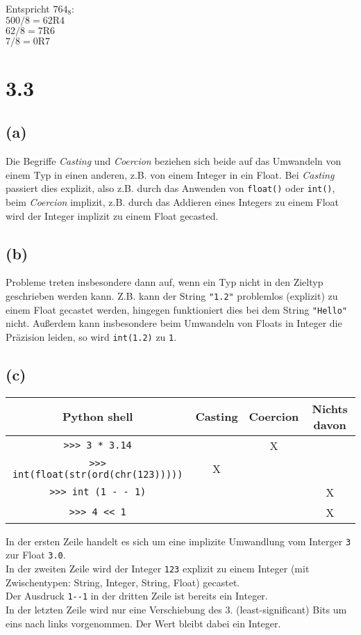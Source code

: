 \begin{enumerate}
Entspricht $764_8$:\\
$500 / 8 = 62 \textrm{R} 4$\\
$62 / 8 = 7 \textrm{R} 6$\\
$7 / 8 = 0 \textrm{R} 7$
\end{enumerate}

\section*{3.3}
\subsection*{(a)}
Die Begriffe \textit{Casting} und \textit{Coercion} beziehen sich beide auf das Umwandeln von einem Typ in einen anderen, z.B. von einem Integer in ein Float. Bei \textit{Casting} passiert dies explizit, also z.B. durch das Anwenden von \verb+float()+ oder \verb+int()+, beim \textit{Coercion} implizit, z.B. durch das Addieren eines Integers zu einem Float wird der Integer implizit zu einem Float gecasted.
\subsection*{(b)}
Probleme treten insbesondere dann auf, wenn ein Typ nicht in den Zieltyp geschrieben werden kann. Z.B. kann der String \verb+"1.2"+ problemlos (explizit) zu einem Float gecastet werden, hingegen funktioniert dies bei dem String \verb+"Hello"+ nicht. Außerdem kann insbesondere beim Umwandeln von Floats in Integer die Präzision leiden, so wird \verb+int(1.2)+ zu \verb+1+.
\subsection*{(c)}
\begin{center}
\begin{tabular}{|c|c|c|c|}
\hline
Python shell & Casting & Coercion & Nichts davon \\\hline\hline
\verb+>>> 3 * 3.14+ & & X & \\\hline
\verb+>>> int(float(str(ord(chr(123)))))+ & X & & \\\hline
\verb+>>> int (1 - - 1)+ & & & X \\\hline
\verb+>>> 4 << 1+ & & & X \\\hline
\end{tabular}
\end{center}
In der ersten Zeile handelt es sich um eine implizite Umwandlung vom Interger \verb+3+ zur Float \verb+3.0+.\\
In der zweiten Zeile wird der Integer \verb+123+ explizit zu einem Integer (mit Zwischentypen: String, Integer, String, Float) gecastet.\\
Der Ausdruck \verb+1--1+ in der dritten Zeile ist bereits ein Integer.\\
In der letzten Zeile wird nur eine Verschiebung des 3. (least-significant) Bits um eins nach links vorgenommen. Der Wert bleibt dabei ein Integer.